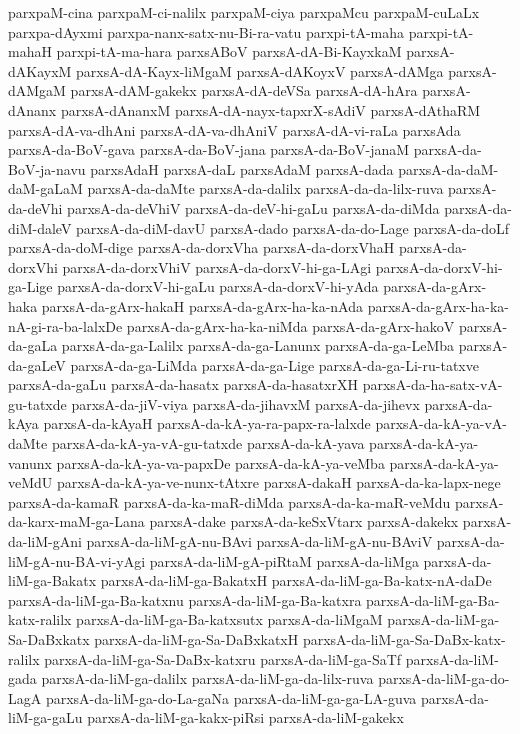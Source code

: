 {parxpaM-cina
parxpaM-ci-nalilx
parxpaM-ciya
parxpaMcu
parxpaM-cuLaLx
parxpa-dAyxmi
parxpa-nanx-satx-nu-Bi-ra-vatu
parxpi-tA-maha
parxpi-tA-mahaH
parxpi-tA-ma-hara
parxsABoV
parxsA-dA-Bi-KayxkaM
parxsA-dAKayxM
parxsA-dA-Kayx-liMgaM
parxsA-dAKoyxV
parxsA-dAMga
parxsA-dAMgaM
parxsA-dAM-gakekx
parxsA-dA-deVSa
parxsA-dA-hAra
parxsA-dAnanx
parxsA-dAnanxM
parxsA-dA-nayx-tapxrX-sAdiV
parxsA-dAthaRM
parxsA-dA-va-dhAni
parxsA-dA-va-dhAniV
parxsA-dA-vi-raLa
parxsAda
parxsA-da-BoV-gava
parxsA-da-BoV-jana
parxsA-da-BoV-janaM
parxsA-da-BoV-ja-navu
parxsAdaH
parxsA-daL
parxsAdaM
parxsA-dada
parxsA-da-daM-daM-gaLaM
parxsA-da-daMte
parxsA-da-dalilx
parxsA-da-da-lilx-ruva
parxsA-da-deVhi
parxsA-da-deVhiV
parxsA-da-deV-hi-gaLu
parxsA-da-diMda
parxsA-da-diM-daleV
parxsA-da-diM-davU
parxsA-dado
parxsA-da-do-Lage
parxsA-da-doLf
parxsA-da-doM-dige
parxsA-da-dorxVha
parxsA-da-dorxVhaH
parxsA-da-dorxVhi
parxsA-da-dorxVhiV
parxsA-da-dorxV-hi-ga-LAgi
parxsA-da-dorxV-hi-ga-Lige
parxsA-da-dorxV-hi-gaLu
parxsA-da-dorxV-hi-yAda
parxsA-da-gArx-haka
parxsA-da-gArx-hakaH
parxsA-da-gArx-ha-ka-nAda
parxsA-da-gArx-ha-ka-nA-gi-ra-ba-lalxDe
parxsA-da-gArx-ha-ka-niMda
parxsA-da-gArx-hakoV
parxsA-da-gaLa
parxsA-da-ga-Lalilx
parxsA-da-ga-Lanunx
parxsA-da-ga-LeMba
parxsA-da-gaLeV
parxsA-da-ga-LiMda
parxsA-da-ga-Lige
parxsA-da-ga-Li-ru-tatxve
parxsA-da-gaLu
parxsA-da-hasatx
parxsA-da-hasatxrXH
parxsA-da-ha-satx-vA-gu-tatxde
parxsA-da-jiV-viya
parxsA-da-jihavxM
parxsA-da-jihevx
parxsA-da-kAya
parxsA-da-kAyaH
parxsA-da-kA-ya-ra-papx-ra-lalxde
parxsA-da-kA-ya-vA-daMte
parxsA-da-kA-ya-vA-gu-tatxde
parxsA-da-kA-yava
parxsA-da-kA-ya-vanunx
parxsA-da-kA-ya-va-papxDe
parxsA-da-kA-ya-veMba
parxsA-da-kA-ya-veMdU
parxsA-da-kA-ya-ve-nunx-tAtxre
parxsA-dakaH
parxsA-da-ka-lapx-nege
parxsA-da-kamaR
parxsA-da-ka-maR-diMda
parxsA-da-ka-maR-veMdu
parxsA-da-karx-maM-ga-Lana
parxsA-dake
parxsA-da-keSxVtarx
parxsA-dakekx
parxsA-da-liM-gAni
parxsA-da-liM-gA-nu-BAvi
parxsA-da-liM-gA-nu-BAviV
parxsA-da-liM-gA-nu-BA-vi-yAgi
parxsA-da-liM-gA-piRtaM
parxsA-da-liMga
parxsA-da-liM-ga-Bakatx
parxsA-da-liM-ga-BakatxH
parxsA-da-liM-ga-Ba-katx-nA-daDe
parxsA-da-liM-ga-Ba-katxnu
parxsA-da-liM-ga-Ba-katxra
parxsA-da-liM-ga-Ba-katx-ralilx
parxsA-da-liM-ga-Ba-katxsutx
parxsA-da-liMgaM
parxsA-da-liM-ga-Sa-DaBxkatx
parxsA-da-liM-ga-Sa-DaBxkatxH
parxsA-da-liM-ga-Sa-DaBx-katx-ralilx
parxsA-da-liM-ga-Sa-DaBx-katxru
parxsA-da-liM-ga-SaTf
parxsA-da-liM-gada
parxsA-da-liM-ga-dalilx
parxsA-da-liM-ga-da-lilx-ruva
parxsA-da-liM-ga-do-LagA
parxsA-da-liM-ga-do-La-gaNa
parxsA-da-liM-ga-ga-LA-guva
parxsA-da-liM-ga-gaLu
parxsA-da-liM-ga-kakx-piRsi
parxsA-da-liM-gakekx
}
